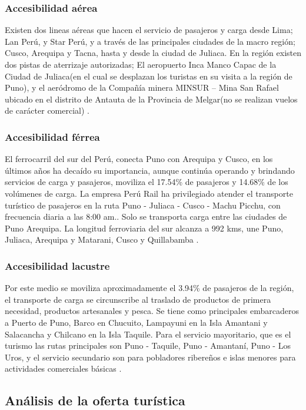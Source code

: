 \subsubsection{Accesibilidad aérea}
Existen dos lineas aéreas que hacen el servicio de pasajeros y carga desde Lima; Lan Perú, y Star Perú, y a través de las principales ciudades de la macro región; Cusco, Arequipa y Tacna, hasta y desde la ciudad de Juliaca. En la región existen dos pistas de aterrizaje autorizadas; El aeropuerto Inca Manco Capac de la Ciudad de Juliaca(en el cual se desplazan los turistas en su visita a la región de Puno), y el aeródromo de la Compañía minera MINSUR – Mina San Rafael ubicado en el distrito de Antauta de la Provincia de Melgar(no se realizan vuelos de carácter comercial) \cite{2011PlanPERTUR}.

\subsubsection{Accesibilidad férrea}
El ferrocarril del sur del Perú, conecta Puno con Arequipa y Cusco, en los últimos años ha decaído su importancia, aunque continúa operando y brindando servicios de carga y pasajeros, moviliza el 17.54\% de pasajeros y 14.68\% de los volúmenes de carga. La empresa Perú Rail ha privilegiado atender el transporte turístico de pasajeros en la ruta Puno - Juliaca - Cusco - Machu Picchu, con frecuencia diaria a las 8:00 am.. Solo se transporta carga entre las ciudades de Puno Arequipa. La longitud ferroviaria del sur alcanza a 992 kms, une Puno, Juliaca, Arequipa y Matarani, Cusco y Quillabamba \cite{2011PlanPERTUR}.

\subsubsection{Accesibilidad lacustre}
Por este medio se moviliza aproximadamente el 3.94\% de pasajeros de la región, el transporte de carga se circunscribe al traslado de productos de primera necesidad, productos artesanales y pesca. Se tiene como principales embarcaderos a Puerto de Puno, Barco en Chucuito, Lampayuni en la Isla Amantani y Salacancha y Chilcano en la Isla Taquile. Para el servicio mayoritario, que es el turismo las rutas principales son Puno - Taquile, Puno - Amantaní, Puno - Los Uros, y el servicio secundario son para pobladores ribereños e islas menores para actividades comerciales básicas \cite{2011PlanPERTUR}.

\subsection{Análisis de la oferta turística}
